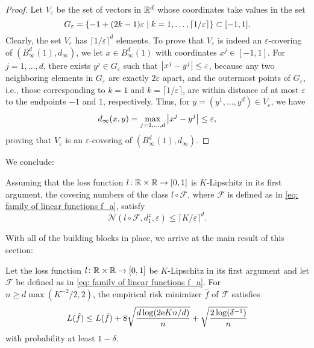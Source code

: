 \begin{proof}
Let $V_{\varepsilon}$ be the set of vectors in $\mathbb{R}^d$ whose coordinates take values in the set
\[
    G_{\varepsilon} = \set{-1 + (2k - 1)\varepsilon \with k = 1, \dots, \lceil 1 / \varepsilon \rceil} \subset [-1, 1].
\]
Clearly, the set $V_{\varepsilon}$ has $\lceil 1 / \varepsilon \rceil^d$ elements. To prove that $V_{\varepsilon}$ is indeed an $\varepsilon$-covering of $(B_{\infty}^d(1), d_{\infty})$, we let $x \in B_{\infty}^d(1)$ with coordinates $x^j \in [-1, 1]$. For $j = 1, \dots, d$, there exists $y^j \in G_{\varepsilon}$ such that $\abs{x^j - y^j} \leq \varepsilon$, because any two neighboring elements in $G_{\varepsilon}$ are exactly $2 \varepsilon$ apart, and the outermost points of $G_{\varepsilon}$, i.e., those corresponding to $k = 1$ and $k = \lceil 1 / \varepsilon \rceil$, are within distance of at most $\varepsilon$ to the endpoints $-1$ and $1$, respectively. Thus, for $y = (y^1, \dots, y^d) \in V_{\varepsilon}$, we have
\[
    d_{\infty}(x, y) = \max_{j = 1, \dots, d} \abs{x^j - y^j} \leq \varepsilon,
\]
proving that $V_{\varepsilon}$ is an $\varepsilon$-covering of $(B_{\infty}^d(1), d_{\infty})$.
\end{proof}

We conclude:

\begin{corollary}
\label{cor: final bound on covering numbers of linear functions}
Assuming that the loss function $l \colon \mathbb{R} \times \mathbb{R} \to [0, 1]$ is $K$-Lipschitz in its first argument, the covering numbers of the class $l \circ \mathcal{F}$, where $\mathcal{F}$ is defined as in \eqref{eq: family of linear functions f_a}, satisfy
\[
    \mathcal{N}(l \circ \mathcal{F}, d_1^z, \varepsilon) \leq {\lceil K / \varepsilon \rceil}^d.
\]
\end{corollary}

With all of the building blocks in place, we arrive at the main result of this section:

\begin{theorem}
Let the loss function $l \colon \mathbb{R} \times \mathbb{R} \to [0, 1]$ be $K$-Lipschitz in its first argument and let $\mathcal{F}$ be defined as in \eqref{eq: family of linear functions f_a}. For $n \geq d \max(K^{-2}/2, 2)$, the empirical risk minimizer $\hat{f}$ of $\mathcal{F}$ satisfies
\[
    L(\hat{f}) \leq L(\bar{f}) + 8 \sqrt{\frac{d \log(2\mathrm{e} Kn / d)}{n}} + \sqrt{\frac{2 \log(\delta^{-1})}{n}}
\]
with probability at least $1 - \delta$.
\end{theorem}

